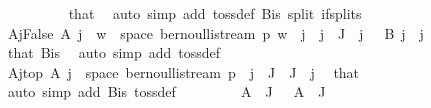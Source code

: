 \begin{isabellebody}
\ \ \ \ \ \ \ \ \isamarkupfalse%
\ that\ \isamarkupfalse%
\ {\isacharparenleft}{\kern0pt}auto\ simp\ add{\isacharcolon}{\kern0pt}\ toss{\isacharunderscore}{\kern0pt}def\ B{\isacharunderscore}{\kern0pt}is{\isacharparenleft}{\kern0pt}{}{\isacharparenright}{\kern0pt}\ split{\isacharcolon}{\kern0pt}\ if{\isacharunderscore}{\kern0pt}splits{\isacharparenright}{\kern0pt}\ \isanewline
\isanewline
\ \ \ \ \ \ \isamarkupfalse%
\ A{\isacharunderscore}{\kern0pt}j{\isacharunderscore}{\kern0pt}False{\isacharcolon}{\kern0pt}\ {\isachardoublequoteopen}A\ j\ {\isacharequal}{\kern0pt}\ {\isacharbraceleft}{\kern0pt}w\ {\isasymin}\ space\ {\isacharparenleft}{\kern0pt}bernoulli{\isacharunderscore}{\kern0pt}stream\ p{\isacharparenright}{\kern0pt}{\isachardot}{\kern0pt}\ {\isasymnot}w\ {\isacharbang}{\kern0pt}{\isacharbang}{\kern0pt}\ j{\isacharbraceright}{\kern0pt}{\isachardoublequoteclose}\ \ {\isachardoublequoteopen}j\ {\isasymin}\ J{\isacharprime}{\kern0pt}\ {\isacharminus}{\kern0pt}\ {\isacharbraceleft}{\kern0pt}j{\isachardot}{\kern0pt}\ {}\ {\isasymin}\ B\ j{\isacharbraceright}{\kern0pt}{\isachardoublequoteclose}\ \ j\ \isanewline
\ \ \ \ \ \ \ \ \isamarkupfalse%
\ that\ B{\isacharunderscore}{\kern0pt}is\ \isamarkupfalse%
\ {\isacharparenleft}{\kern0pt}auto\ simp\ add{\isacharcolon}{\kern0pt}\ toss{\isacharunderscore}{\kern0pt}def{\isacharparenright}{\kern0pt}\ \isanewline
\ \ \ \ \ \ \isanewline
\ \ \ \ \ \ \isamarkupfalse%
\ A{\isacharunderscore}{\kern0pt}j{\isacharunderscore}{\kern0pt}top{\isacharcolon}{\kern0pt}\ {\isachardoublequoteopen}A\ j\ {\isacharequal}{\kern0pt}\ space\ {\isacharparenleft}{\kern0pt}bernoulli{\isacharunderscore}{\kern0pt}stream\ p{\isacharparenright}{\kern0pt}{\isachardoublequoteclose}\ \ {\isachardoublequoteopen}j\ {\isasymin}\ J\ {\isacharminus}{\kern0pt}\ J{\isacharprime}{\kern0pt}{\isachardoublequoteclose}\ \ j\ \isamarkupfalse%
\ that\ {\isacharasterisk}{\kern0pt}\ \isamarkupfalse%
\ {\isacharparenleft}{\kern0pt}auto\ simp\ add{\isacharcolon}{\kern0pt}\ B{\isacharunderscore}{\kern0pt}is\ toss{\isacharunderscore}{\kern0pt}def{\isacharparenright}{\kern0pt}\isanewline
\ \ \ \ \ \ \isamarkupfalse%
\ {\isachardoublequoteopen}{\isasymInter}\ {\isacharparenleft}{\kern0pt}A\ {\isacharbackquote}{\kern0pt}\ J{\isacharparenright}{\kern0pt}\ {\isacharequal}{\kern0pt}\ {\isasymInter}\ {\isacharparenleft}{\kern0pt}A\ {\isacharbackquote}{\kern0pt}\ J{\isacharprime}{\kern0pt}{\isacharparenright}{\kern0pt}{\isachardoublequoteclose}\ \isamarkupfalse%

\end{isabellebody}
